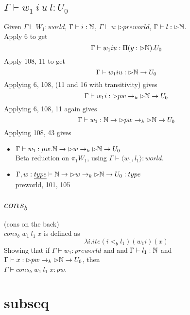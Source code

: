 \documentclass{article}
\begin{document}
\subsection{$\Gamma \vdash w_1 \: i \: u \: l : U_0$}
Given $\Gamma \vdash W_1 : world$, $\Gamma \vdash i : \mathbb{N}$, $\Gamma \vdash u : \rhd preworld$, $\Gamma \vdash l : \rhd \mathbb{N}$.\\
 Apply 6 to get
   \[\Gamma \vdash w_1 i u: \Pi(y: \rhd \mathbb{N}). U_0 \]
Apply 108, 11 to get
\[\Gamma \vdash w_1 i u:  \rhd \mathbb{N} \rightarrow U_0 \]
Applying 6, 108, (11 and 16 with transitivity) gives
\[\Gamma \vdash w_1 i: \rhd pw \rightarrow_k \rhd \mathbb{N} \rightarrow U_0 \]
Applying 6, 108, 11 again gives 
\[\Gamma \vdash w_1: \mathbb{N} \rightarrow \rhd pw \rightarrow_k \rhd \mathbb{N} \rightarrow U_0 \]
      Applying 108, 43 gives
\begin{itemize}
       \item $\Gamma \vdash w_1: \mu w. \mathbb{N} \rightarrow \rhd w \rightarrow_k \rhd \mathbb{N} \rightarrow U_0 $\\
         Beta reduction on $\pi_1 W_1$, using $\Gamma \vdash \langle w_1, l_1 \rangle : world$.
      \item $\Gamma, w: \underline{type} \vdash \mathbb{N} \rightarrow \rhd w \rightarrow_k \rhd \mathbb{N} \rightarrow U_0 : type $\\
            preworld, 101, 105
                  \end{itemize}
                  
\subsection{$cons_b$}
(cons on the back)\\
$cons_b \; w_1 \: l_1 \; x$ is defined as
\[ \lambda i. ite (i <_b l_1) (w_1 i) (x)\]
Showing that if $\Gamma \vdash w_1 : preworld$ and
and $\Gamma \vdash l_1 : \mathbb{N}$ and
$\Gamma \vdash x: \rhd pw \rightarrow_k \rhd \mathbb{N} \rightarrow U_0$, then \\$\Gamma \vdash cons_b \; w_1 \: l_1 \; x : pw$.



\section*{subseq}
\end{document}
